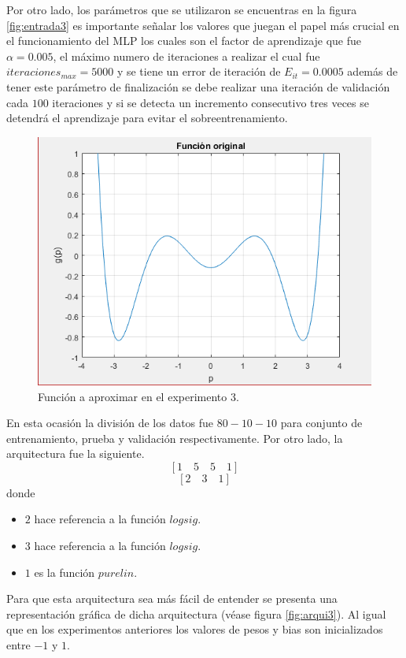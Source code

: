 Por otro lado, los parámetros que se utilizaron se encuentras en la figura \ref{fig:entrada3} es importante señalar los valores que juegan el papel más crucial en el funcionamiento del MLP los cuales son el factor de aprendizaje que fue$\alpha=0.005$, el máximo numero de iteraciones a realizar el cual fue $iteraciones_{max} = 5000$ y se tiene un error de iteración de $E_{it} = 0.0005$ además de tener este parámetro de finalización se debe realizar una iteración de validación cada $100$ iteraciones y si se detecta un incremento consecutivo tres veces se detendrá el aprendizaje para evitar el sobreentrenamiento.
\begin{figure}[H]
    \begin{center}
        \includegraphics[width=14cm]{3/original.png}
        \caption{Función a aproximar en el experimento 3.}
        \label{fig:original3}
    \end{center}
\end{figure}
En esta ocasión la división de los datos fue $80-10-10$ para conjunto de entrenamiento, prueba y validación respectivamente. Por otro lado, la arquitectura fue la siguiente.
\[ \left[ 1 \quad 5 \quad 5 \quad 1 \right] \]
\[ \left[ 2 \quad 3 \quad 1 \right] \]
donde
\begin{itemize}
    \item $2$ hace referencia a la función $logsig$.
    \item $3$ hace referencia a la función $logsig$.
    \item $1$ es la función $purelin$.
\end{itemize}
Para que esta arquitectura sea más fácil de entender se presenta una representación gráfica de dicha arquitectura (véase figura \ref{fig:arqui3}). Al igual que en los experimentos anteriores los valores de pesos y bias son inicializados entre $-1$ y $1$.
